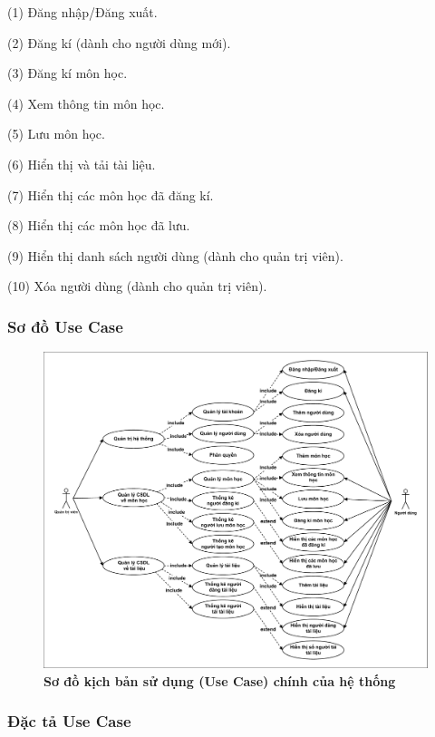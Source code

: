 \documentclass{article}
\begin{document}
		(1) Đăng nhập/Đăng xuất.
		
		(2) Đăng kí (dành cho người dùng mới).
		
		(3) Đăng kí môn học.
		
		(4) Xem thông tin môn học.
		
		(5) Lưu môn học.
		
		(6) Hiển thị và tải tài liệu.
		
		(7) Hiển thị các môn học đã đăng kí.
		
		(8) Hiển thị các môn học đã lưu.
		
		(9) Hiển thị danh sách người dùng (dành cho quản trị viên).
		
		(10) Xóa người dùng (dành cho quản trị viên).
	
	\subsubsection{Sơ đồ Use Case}
	
	\begin{figure}[!ht]
		\centering
		\includegraphics[trim= 10pt 10pt 10pt 10pt, clip, width=16.5cm]{usecase_fig38.pdf}
		\caption [Sơ đồ kịch bản sử dụng (Use Case) chính của hệ thống]{\bfseries \fontsize{12pt}{0pt}\selectfont Sơ đồ kịch bản sử dụng (Use Case) chính của hệ thống}
		\label{fig37}
	\end{figure}
	
	\subsubsection{Đặc tả Use Case}
	
\end{document}
